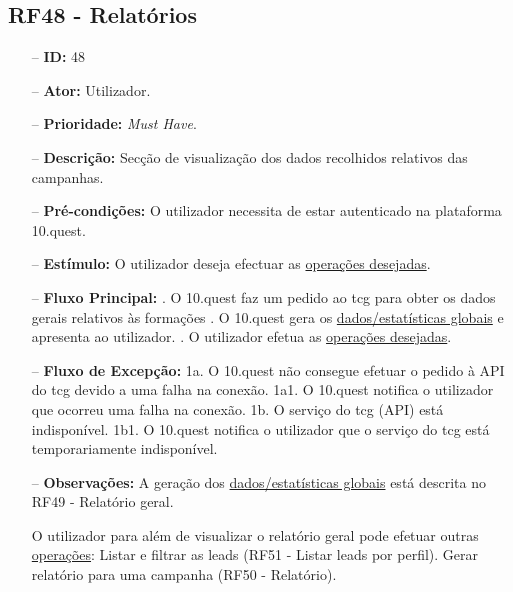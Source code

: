\subsection{RF48 - Relatórios}
\begin{itemize}
	\item[--] \textbf{ID:} 48
	\item[--]  \textbf{Ator:} Utilizador.
	\item[--]  \textbf{Prioridade:} \textit{Must Have}.
	\item[--]  \textbf{Descrição:} Secção de visualização dos dados recolhidos relativos das campanhas. 
	\item[--]  \textbf{Pré-condições:} O utilizador necessita de estar autenticado na plataforma 10.quest.
	\item[--]  \textbf{Estímulo:} O utilizador deseja efectuar as \underline{operações desejadas}.
	\item[--]  \textbf{Fluxo Principal:} 
		. O 10.quest faz um pedido ao \acrshort{tcg} para obter os dados gerais relativos às formações
		. O 10.quest gera os \underline{dados/estatísticas globais} e apresenta ao utilizador.
		. O utilizador efetua as \underline{operações desejadas}.
	\item[--]  \textbf{Fluxo de Excepção:} 
		\subitem 1a. O 10.quest não consegue efetuar o pedido à API do \acrshort{tcg} devido a uma falha na conexão.
		\subitem 1a1. O 10.quest notifica o utilizador que ocorreu uma falha na conexão.
		\subitem 1b. O serviço do \acrshort{tcg} (API) está indisponível.
		\subitem 1b1. O 10.quest notifica o utilizador que o serviço do \acrshort{tcg} está temporariamente indisponível. 
	\item[--]  \textbf{Observações:} A geração dos \underline{dados/estatísticas globais} está descrita no RF49 - Relatório geral.
	
	O utilizador para além de visualizar o relatório geral pode efetuar outras \underline{operações}:
		\subitem Listar e filtrar as leads (RF51 - Listar leads por perfil).
		\subitem Gerar relatório para uma campanha (RF50 - Relatório).
	
\end{itemize}
\newpage

